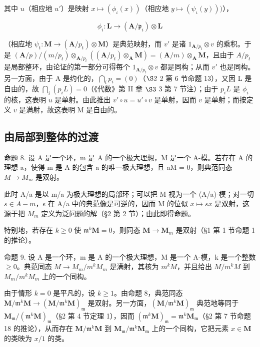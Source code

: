其中 \(u\)（相应地 \(u'\)）是映射 \(x \mapsto (\phi_{\iota}(x))\)（相应地 \(y \mapsto (\psi_{\iota}(y)))\)），

\[
\phi_ {i} \colon \mathbf {L} \rightarrow (\mathbf {A} / \mathfrak {p} _ {i}) \otimes \mathbf {L}
\]

（相应地 \(\psi_{t}\colon\mathbf{M}\to(\mathbf{A}/p_{t})\otimes\mathbf{M}\)）是典范映射，而 \(v'\) 是诸 \(1_{\mathbf{A}/p_{t}}\otimes v\) 的乘积。于是 \((\mathbf{A}/p)/(m/p_{t})\otimes_{\mathbf{A}/p_{t}}((\mathbf{A}/p_{t})\otimes_{\mathbf{A}}\mathbf{M})=(\mathbf{A}/m)\otimes_{\mathbf{A}}\mathbf{M}\)，且由于 \(A/p_{t}\) 是局部整环，由论证的第一部分可得每个 \(1_{\mathbf{A}/p_{t}}\otimes v\) 都是同构；从而 \(v'\) 也是同构。另一方面，由于 A 是约化的，\(\bigcap_{i} p_{i} = (0)\)（\(\S 2\) 2 第 6 节命题 13），又因 L 是自由的，故 \(\bigcap_{i} (p_{i} L) = 0\)（《代数》第 II 章 \(\S 3\) 3 第 7 节注）；由于 \(p_{i} L\) 是 \(\phi_{i}\) 的核，这表明 \(u\) 是单射。由此推出 \(v' \circ u = u' \circ v\) 是单射，因而 \(v\) 是单射；而按定义 \(v\) 是满射，故这表明 M 是自由的。

\subsection{由局部到整体的过渡}

命题 8. 设 A 是一个环，m 是 A 的一个极大理想，M 是一个 A-模。若存在 A 的理想 a，使得 m 是 A 的包含 a 的唯一极大理想，且 aM = 0，则典范同态 \(M \rightarrow M_{m}\) 是双射。

此时 A/a 是以 m/a 为极大理想的局部环；可以把 M 视为一个 (A/a)-模；对一切 \(s \in A - m\)，s 在 A/a 中的典范像是可逆的，因而 M 的位似 \(x \mapsto sx\) 是双射，这源于把 \(M_{m}\) 定义为泛问题的解（§2 第 2 节）；由此即得命题。

特别地，若存在 \(k \geqslant 0\) 使 \(\mathfrak{m}^k\mathbf{M} = 0\)，则同态 \(\mathbf{M} \to \mathbf{M}_m\) 是双射（§1 第 1 节命题 1 的推论）。

命题 9. 设 A 是一个环，m 是 A 的一个极大理想，M 是一个 A-模，k 是一个整数 \(\geqslant0\)。典范同态 \(M\to M_{m}/m^{k}M_{m}\) 是满射，其核为 \(m^{k}M\)，并且给出 \(M/m^{k}M\) 到 \(M_{m}/m^{k}M_{m}\) 上的一个同构。

由于情形 \(k=0\) 是平凡的，设 \(k\geqslant1\)。由命题 8，典范同态 \(\mathbf{M}/\mathfrak{m}^{k}\mathbf{M}\to(\mathbf{M}/\mathfrak{m}^{k}\mathbf{M})_{\mathfrak{m}}\) 是双射。另一方面，\((\mathbf{M}/\mathfrak{m}^{k}\mathbf{M})_{\mathfrak{m}}\) 典范地等同于 \(\mathbf{M}_{\mathfrak{m}}/(\mathfrak{m}^{k}\mathbf{M})_{\mathfrak{m}}\)（§2 第 4 节定理 1），因而 \((\mathfrak{m}^{k}\mathbf{M})_{\mathfrak{m}}=\mathfrak{m}^{k}\mathbf{M}_{\mathfrak{m}}\)（§2 第 7 节命题 18 的推论），从而存在 \(\mathbf{M}/\mathfrak{m}^{k}\mathbf{M}\) 到 \(\mathbf{M}_{\mathfrak{m}}/\mathfrak{m}^{k}\mathbf{M}_{\mathfrak{m}}\) 上的一个同构，它把元素 \(x\in\mathbf{M}\) 的类映为 \(x/1\) 的类。

